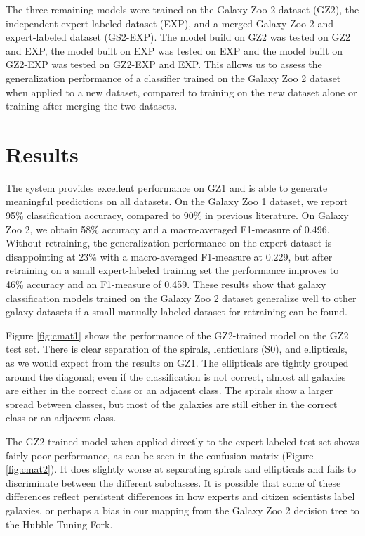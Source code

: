 \documentclass{article}
\begin{document}
The three remaining models were trained on the Galaxy Zoo 2 dataset (GZ2), the independent expert-labeled dataset (EXP), and a merged Galaxy Zoo 2 and expert-labeled dataset (GS2-EXP). The model build on GZ2 was tested on GZ2 and EXP, the model built on EXP was tested on EXP and the model built on GZ2-EXP was tested on GZ2-EXP and EXP. This allows us to assess the generalization performance of a classifier trained on the Galaxy Zoo 2 dataset when applied to a new dataset, compared to training on the new dataset alone or training after merging the two datasets.

\section{Results}
The system provides excellent performance on GZ1 and is able to generate meaningful predictions on all datasets. On the Galaxy Zoo 1 dataset, we report 95\% classification accuracy, compared to 90\% in previous literature. On Galaxy Zoo 2, we obtain 58\% accuracy and a macro-averaged F1-measure of 0.496. Without retraining, the generalization performance on the expert dataset is disappointing at 23\% with a macro-averaged F1-measure at 0.229, but after retraining on a small expert-labeled training set the performance improves to 46\% accuracy and an F1-measure of 0.459. These results show that galaxy classification models trained on the Galaxy Zoo 2 dataset generalize well to other galaxy datasets if a small manually labeled dataset for retraining can be found. 

Figure \ref{fig:cmat1} shows the performance of the GZ2-trained model on the GZ2 test set. There is clear separation of the spirals, lenticulars (S0), and ellipticals, as we would expect from the results on GZ1. The ellipticals are tightly grouped around the diagonal; even if the classification is not correct, almost all galaxies are either in the correct class or an adjacent class. The spirals show a larger spread between classes, but most of the galaxies are still either in the correct class or an adjacent class. 

The GZ2 trained model when applied directly to the expert-labeled test set shows fairly poor performance, as can be seen in the confusion matrix (Figure \ref{fig:cmat2}). It does slightly worse at separating spirals and ellipticals and fails to discriminate between the different subclasses. It is possible that some of these differences reflect persistent differences in how experts and citizen scientists label galaxies, or perhaps a bias in our mapping from the Galaxy Zoo 2 decision tree to the Hubble Tuning Fork. 
\end{document}
